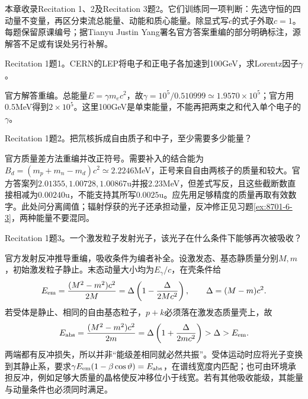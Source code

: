 本章收录Recitation 1、2及Recitation 3题2。它们训练同一项判断：先选守恒的四动量不变量，再区分束流总能量、动能和质心能量。除显式写$c$的式子外取$c=1$。每题保留原课编号；据Tianyu Justin Yang署名官方答案重编的部分明确标注，源解答不足或有误处另行补解。
\begin{exercise}\label{ex:rec-1-1}
Recitation 1题1。CERN的LEP将电子和正电子各加速到100GeV，求Lorentz因子$\gamma$。
\end{exercise}
\begin{solution}
官方解答重编。总能量$E=\gamma m_ec^2$，故$\gamma=10^5/0.510999\simeq1.9570\times10^5$；官方用$0.5$MeV得到$2\times10^5$。这里100GeV是单束能量，不能再把两束之和代入单个电子的$\gamma$。
\end{solution}
\begin{exercise}\label{ex:rec-1-2}
Recitation 1题2。把氘核拆成自由质子和中子，至少需要多少能量？
\end{exercise}
\begin{solution}
官方质量差方法重编并改正符号。需要补入的结合能为$B_d=(m_p+m_n-m_d)c^2\simeq2.2246$MeV，正号来自自由两核子的质量和较大。官方答案列$2.01355,1.00728,1.00867$u并报2.23MeV，但差式写反，且这些截断数直接相减为$0.00240$u，不能支持其所写$0.0025$u。应先用足够精度的质量再取有效数字。此处问分离阈值；辐射俘获的光子还承担动量，反冲修正见习题\ref{ex:8701-6-3}，两种能量不要混同。
\end{solution}
\begin{exercise}\label{ex:rec-1-3}
Recitation 1题3。一个激发粒子发射光子，该光子在什么条件下能够再次被吸收？
\end{exercise}
\begin{solution}
官方发射反冲推导重编，吸收条件为编者补全。设激发态、基态静质量分别$M,m$，初始激发粒子静止。末态动量大小均为$E_\gamma/c$，在壳条件给
\begin{equation}
 E_{\rm em}=\frac{(M^2-m^2)c^2}{2M}
 =\Delta\left(1-\frac{\Delta}{2Mc^2}\right),\qquad \Delta=(M-m)c^2.
\end{equation}
若受体是静止、相同的自由基态粒子，$p+ k$必须落在激发态质量壳上，故
\begin{equation}
 E_{\rm abs}=\frac{(M^2-m^2)c^2}{2m}
 =\Delta\left(1+\frac{\Delta}{2mc^2}\right)>\Delta>E_{\rm em}.
\end{equation}
两端都有反冲损失，所以并非“能级差相同就必然共振”。受体运动时应将光子变换到其静止系，要求$\gamma E_{\rm em}(1-\beta\cos\vartheta)=E_{\rm abs}$，在谱线宽度内匹配；也可由环境承担反冲，例如足够大质量的晶格使反冲移位小于线宽。若有其他吸收能级，其能量与动量条件也必须同时满足。
\end{solution}
